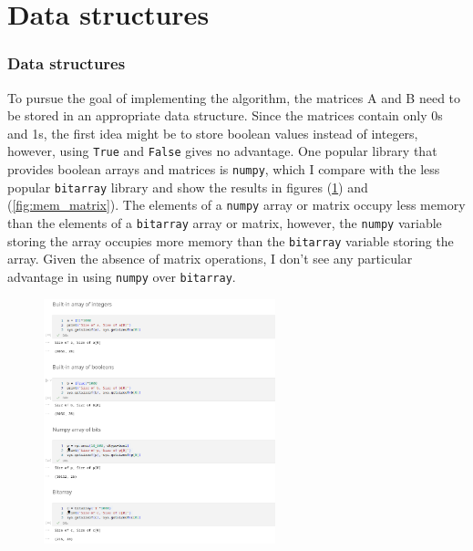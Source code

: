 \documentclass{beamer}
\begin{document}
\section*{Data structures}

\begin{frame}
    \frametitle{Data structures}

    To pursue the goal of implementing the algorithm, the matrices A and B need
    to be stored in an appropriate data structure. Since the matrices contain
    only 0s and 1s, the first idea might be to store boolean values instead
    of integers, however, using 
    \texttt{True} and \texttt{False} gives no advantage.
    One popular library that provides boolean arrays and matrices is
    \texttt{numpy}, which I compare with the less popular \texttt{bitarray}
    library and show the results in figures (\ref{fig:mem_array}) and 
    (\ref{fig:mem_matrix}).
    The elements of a \texttt{numpy} array or matrix occupy less memory than
    the elements of a \texttt{bitarray} array or matrix, however,
    the \texttt{numpy} variable storing the array occupies more memory 
    than the \texttt{bitarray} variable storing the array.
    Given the absence of matrix operations, I don't see any 
    particular advantage in using \texttt{numpy} over \texttt{bitarray}.
    
\end{frame}

\begin{frame}
        \begin{figure}
            \centering
            \includegraphics[width=0.6\textwidth]{mem_array.png}
            \label{fig:mem_array}
        \end{figure}
\end{frame}
\end{document}

